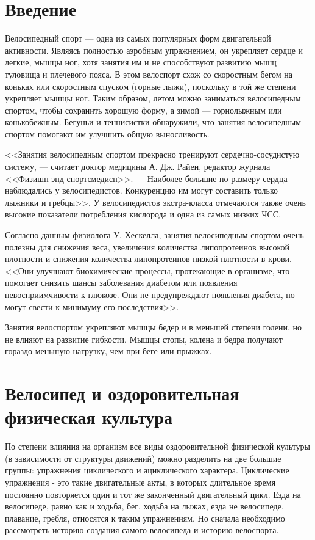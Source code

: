 \documentclass[a4paper,14pt]{extreport}
\begin{document}

\addtocounter{page}{1}

\tableofcontents

\chapter*{Введение}

Велосипедный спорт — одна из самых популярных форм двигательной активности. Являясь полностью аэробным упражнением, он укрепляет сердце и легкие, мышцы ног, хотя занятия им и не способствуют развитию мышц туловища и плечевого пояса. В этом велоспорт схож со скоростным бегом на коньках или скоростным спуском (горные лыжи), поскольку в той же степени укрепляет мышцы ног. Таким образом, летом можно заниматься велосипедным спортом, чтобы сохранить хорошую форму, а зимой — горнолыжным или конькобежным. Бегуньи и теннисистки обнаружили, что занятия велосипедным спортом помогают им улучшить общую выносливость.

<<Занятия велосипедным спортом прекрасно тренируют сердечно-сосудистую систему, — считает доктор медицины А. Дж. Райен, редактор журнала <<Физишн энд спортсмедисн>>. — Наиболее большие по размеру сердца наблюдались у велосипедистов. Конкуренцию им могут составить только лыжники и гребцы>>. У велосипедистов экстра-класса отмечаются также очень высокие показатели потребления кислорода и одна из самых низких ЧСС.

Согласно данным физиолога У. Хескелла, занятия велосипедным спортом очень полезны для снижения веса, увеличения количества липопротеинов высокой плотности и снижения количества липопротеинов низкой плотности в крови. <<Они улучшают биохимические процессы, протекающие в организме, что помогает снизить шансы заболевания диабетом или появления невосприимчивости к глюкозе. Они не предупреждают появления диабета, но могут свести к минимуму его последствия>>.

Занятия велоспортом укрепляют мышцы бедер и в меньшей степени голени, но не влияют на развитие гибкости. Мышцы стопы, колена и бедра получают гораздо меньшую нагрузку, чем при беге или прыжках.

\chapter{Велосипед и оздоровительная физическая культура}
По степени влияния на организм все виды оздоровительной физической культуры (в зависимости от структуры движений) можно разделить на две большие группы: упражнения циклического и ациклического характера.
Циклические упражнения - это такие двигательные акты, в которых длительное время постоянно повторяется один и тот же законченный двигательный цикл. Езда на велосипеде, равно как и ходьба, бег, ходьба на лыжах, езда не велосипеде, плавание, гребля, относятся к таким упражнениям. Но сначала необходимо рассмотреть историю создания самого велосипеда и историю велоспорта.
\end{document}
